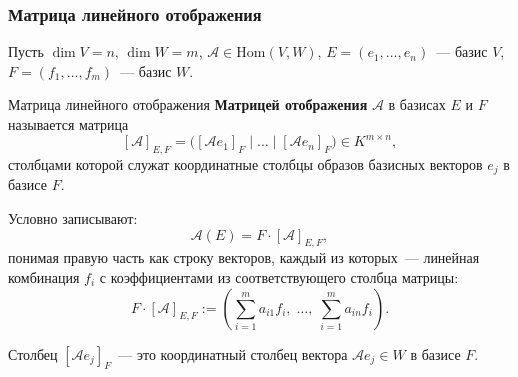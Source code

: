 \subsubsection*{Матрица линейного отображения}

Пусть $\dim V = n$, $\dim W = m$, $\mathcal{A} \in \mathrm{Hom}(V, W)$,
$E = (e_1, \ldots, e_n)$~--- базис $V$, $F = (f_1, \ldots, f_m)$~--- базис $W$.

\begin{Definition}{Матрица линейного отображения}{}
	\textbf{Матрицей отображения} $\mathcal{A}$ в базисах $E$ и $F$ называется матрица
	\[
	[\mathcal{A}]_{E,F} = \bigl([\mathcal{A}e_1]_F \;\Big|\; \ldots \;\Big|\; [\mathcal{A}e_n]_F\bigr) \in K^{m \times n},
	\]
	столбцами которой служат координатные столбцы образов базисных векторов $e_j$ в базисе $F$.
	
	Условно записывают:
	\[
	\mathcal{A}(E) = F \cdot [\mathcal{A}]_{E,F},
	\]
	понимая правую часть как строку векторов, каждый из которых~--- линейная комбинация $f_i$
	с коэффициентами из соответствующего столбца матрицы:
	\[
	F \cdot [\mathcal{A}]_{E,F}
	:=
	\left(
	\sum_{i=1}^m a_{i1} f_i,\;
	\ldots,\;
	\sum_{i=1}^m a_{in} f_i
	\right).
	\]
\end{Definition}

\begin{remark}
	Столбец $[\mathcal{A}e_j]_F$~--- это координатный столбец вектора $\mathcal{A}e_j \in W$ в базисе $F$.
\end{remark}